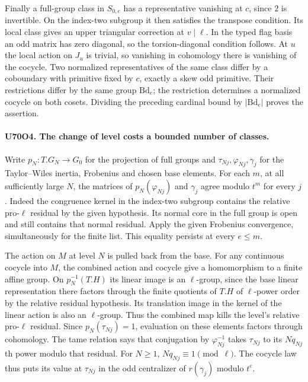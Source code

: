 Finally a full-group class in $S_{0,e}$ has a representative
vanishing at $c$, since $2$ is invertible. On the index-two
subgroup it then satisfies the transpose condition. Its local
class gives an upper triangular correction at $v\mid\ell$.
In the typed flag basis an odd matrix has zero diagonal, so the
torsion-diagonal condition follows. At $u$ the local action on
$J_u$ is trivial, so vanishing in cohomology there is vanishing
of the cocycle. Two normalized representatives of the same class
differ by a coboundary with primitive fixed by $c$, exactly a
skew odd primitive. Their restrictions differ by the same group
$\mathrm{Bd}_e$; the restriction determines a normalized cocycle
on both cosets. Dividing the preceding cardinal bound by
$|\mathrm{Bd}_e|$ proves the assertion.

\paragraph{U70O4. The change of level costs a bounded number of classes.}
Write $p_N:T.G_N\to G_0$ for the projection of full groups and
$\tau_{Nj},\varphi_{Nj},\gamma_j$ for the Taylor--Wiles inertia,
Frobenius and chosen base elements. For each $m$, at all sufficiently
large $N$, the matrices of $p_N(\varphi_{Nj})$ and $\gamma_j$
agree modulo $t^m$ for every $j$. Indeed the congruence kernel
in the index-two subgroup contains the relative pro-$\ell$
residual by the given hypothesis. Its normal core in the full
group is open and still contains that normal residual. Apply
the given Frobenius convergence, simultaneously for the finite
list. This equality persists at every $e\le m$.

The action on $M$ at level $N$ is pulled back from the base.
For any continuous cocycle into $M$, the combined action and
cocycle give a homomorphism to a finite affine group.
On $p_N^{-1}(T.H)$ its linear image is an $\ell$-group, since
the base linear representation there factors through the finite
quotients of $T.H$ of $\ell$-power order by the relative residual
hypothesis. Its translation image in the kernel of the linear action
is also an $\ell$-group. Thus the combined map kills the level's
relative pro-$\ell$ residual. Since $p_N(\tau_{Nj})=1$,
evaluation on these elements factors through cohomology.
The tame relation says that conjugation by $\varphi_{Nj}^{-1}$
takes $\tau_{Nj}$ to its $Nq_{Nj}$th power modulo that
residual. For $N\ge1$, $Nq_{Nj}\equiv1\pmod\ell$.
The cocycle law thus puts its value at $\tau_{Nj}$ in the odd
centralizer of $r(\gamma_j)$ modulo $t^e$.

